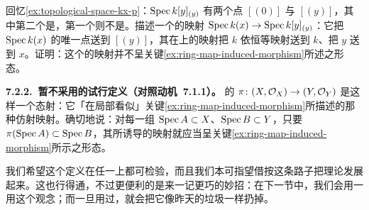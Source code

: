 \begin{exercise}\label{ex:exotic-ringed-space-map}
回忆\cref{ex:topological-space-kx-p}：$\operatorname{Spec} k[y]_{(y)}$ 有两个点 $[(0)]$ 与 $[(y)]$，其中第二个是\trClosedPoint{}，第一个则不是。描述一个\emph{\trRingedSpace}的映射 $\operatorname{Spec} k(x)\to\operatorname{Spec} k[y]_{(y)}$：它把 $\operatorname{Spec} k(x)$ 的唯一点送到\trClosedPoint{} $[(y)]$，其在\trGlobalSections{}上的\trPullback{}映射把 $k$ 依恒等映射送到 $k$、把 $y$ 送到 $x$。证明：这个\trRingedSpace{}的映射并不呈关键\cref{ex:ring-map-induced-morphism}所述之形态。
\end{exercise}

\textbf{7.2.2.\ 暂不采用的试行定义（对照\mbox{动机~7.1.1}）。}%
\quad \trScheme{}的\trMorphism{} $\pi\colon(X,\mathcal{O}_X)\to(Y,\mathcal{O}_Y)$ 是这样一个\trRingedSpace{}态射：它「在局部看似」关键\cref{ex:ring-map-induced-morphism}所描述的那种仿射\trScheme{}映射。确切地说：对每一组\trAffine\trOpenSet{} $\operatorname{Spec} A\subset X$、$\operatorname{Spec} B\subset Y$，只要 $\pi(\operatorname{Spec} A)\subset\operatorname{Spec} B$，其所诱导的\trRingedSpace{}映射就应当呈关键\cref{ex:ring-map-induced-morphism}所示之形态。

我们希望这个定义在任一\trAffine\trCover{}上都可检验，而且我们本可指望借\trAffineCommunicationLemma{}按这条路子把理论发展起来。这也行得通，不过更便利的是来一记更巧的妙招：在下一节中，我们会用一用\trLocallyRingedSpace{}这个观念；而一旦用过，就会把它像昨天的垃圾一样扔掉。%
